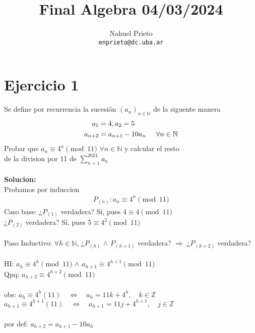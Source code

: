 \documentclass[a4paper]{article}
\title{Final Algebra 04/03/2024}
\author{Nahuel Prieto \\ \texttt{enprieto@dc.uba.ar}}
\date{}
\begin{document}
\maketitle

\section{Ejercicio 1}
    Se define por recurrencia la sucesión $(a_{n})_{n \in \mathbb{N}}$ de la siguente manera 
\begin{align*}
    a_1 &= 4,  a_2 = 5 \\ a_{n+2} &= a_{n+1} - 10a_n \hspace{0.5cm} \forall n \in \mathbb{N}
\end{align*}
Probar que $a_n\equiv 4^n \pmod{11}$ $\forall n \in \mathbb{N}$ y calcular el resto \\
de la division por 11 de $\sum_{n=1}^{2024} a_n$\\ \\
\textbf{Solucion:} \\
Probamos por induccion
\begin{align*}   
    P_{(n)}: a_n \equiv 4^n \pmod{11}
\end{align*}
Caso base: ¿$P_{(1)}$ verdadera? Sí, pues $4 \equiv 4 \pmod{11}$\\
\hspace*{50px}¿$P_{(2)}$ verdadera? Sí, pues $5 \equiv 4^2 \pmod{11}$ \\ \\
Paso Inductivo: $\forall h \in \mathbb{N}$, ¿$P_{(h)}$ $\land$ $P_{(h+1)}$ verdadera? $\Rightarrow$ ¿$P_{(h+2)}$ verdadera? \\ \\
HI: $a_h \equiv 4^h \pmod{11}$ $\land$ $a_{h+1} \equiv 4^{h+1} \pmod{11}$ \\
Qpq: $a_{h+2} \equiv 4^{h+2} \pmod{11}$ \\ \\
obs: $a_h \equiv 4^h (11) \quad \Longleftrightarrow \quad a_h = 11k +4^h, \quad k \in \mathbb{Z}$  \\
\hspace*{0.4cm}$a_{h+1} \equiv 4^{h+1} (11) \quad \Longleftrightarrow \quad a_{h+1} = 11j +4^{h+1}, \quad j \in \mathbb{Z}$ \\ \\
por def: $a_{h+2} = a_{h+1} - 10a_h$     
\end{document}
